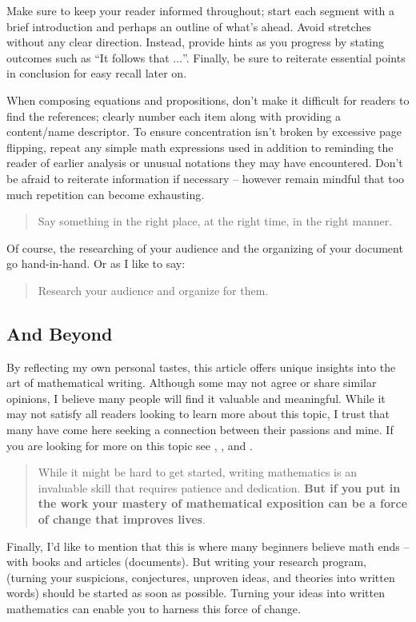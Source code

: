 \documentclass[
  twoside,
  12pt,
  letterpaper,
  fleqn]{article}
\begin{document}
Make sure to keep your reader informed throughout; start each segment
with a brief introduction and perhaps an outline of what's ahead. Avoid
stretches without any clear direction. Instead, provide hints as you
progress by stating outcomes such as ``It follows that \(\ldots\)''.
Finally, be sure to reiterate essential points in conclusion for easy
recall later on.

When composing equations and propositions, don't make it difficult for
readers to find the references; clearly number each item along with
providing a content/name descriptor. To ensure concentration isn't
broken by excessive page flipping, repeat any simple math expressions
used in addition to reminding the reader of earlier analysis or unusual
notations they may have encountered. Don't be afraid to reiterate
information if necessary -- however remain mindful that too much
repetition can become exhausting.

\begin{quote}
Say something in the right place, at the right time, in the right
manner.
\end{quote}

Of course, the researching of your audience and the organizing of your
document go hand-in-hand. Or as I like to say:

\begin{quote}
Research your audience and organize for them.
\end{quote}

\hypertarget{and-beyond}{%
\subsection{And Beyond}\label{and-beyond}}

By reflecting my own personal tastes, this article offers unique
insights into the art of mathematical writing. Although some may not
agree or share similar opinions, I believe many people will find it
valuable and meaningful. While it may not satisfy all readers looking to
learn more about this topic, I trust that many have come here seeking a
connection between their passions and mine. If you are looking for more
on this topic see \textcite{halmos1970write},
\textcite{steenrod1973write}, and \textcite{higham1998handbook}.

\begin{quote}
While it might be hard to get started, writing mathematics is an
invaluable skill that requires patience and dedication. \textbf{But if
you put in the work your mastery of mathematical exposition can be a
force of change that improves lives}.
\end{quote}

Finally, I'd like to mention that this is where many beginners believe
math ends -- with books and articles (documents). But writing your
research program, (turning your suspicions, conjectures, unproven ideas,
and theories into written words) should be started as soon as possible.
Turning your ideas into written mathematics can enable you to harness
this force of change.


\printbibliography



\thispagestyle{empty}
\end{document}
